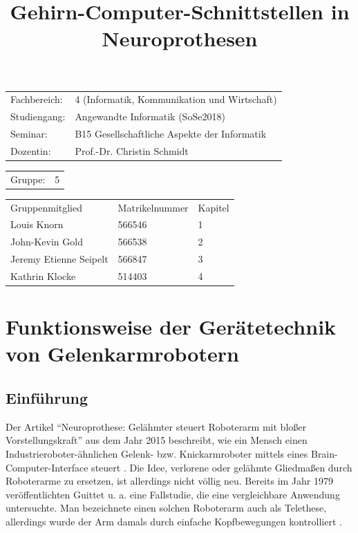 \documentclass[11pt,ngerman,parskip=half]{scrartcl}
\author{}
\title{Gehirn-Computer-Schnittstellen in Neuroprothesen}
\begin{document}
\maketitle
\begin{tabular}{ll}
  Fachbereich: & 4 (Informatik, Kommunikation und Wirtschaft) \\
  Studiengang: & Angewandte Informatik (SoSe2018)             \\
  Seminar:     & B15 Gesellschaftliche Aspekte der Informatik \\
  Dozentin:    & Prof.-Dr. Christin Schmidt                   \\
\end{tabular}

\begin{tabular}{ll}
  Gruppe: & 5 \\
\end{tabular}

\begin{tabular}{lll}
  Gruppenmitglied        & Matrikelnummer & Kapitel\\
  Louis Knorn            & 566546         & 1\\
  John-Kevin Gold        & 566538         & 2\\
  Jeremy Etienne Seipelt & 566847         & 3\\
  Kathrin Klocke         & 514403         & 4\\
\end{tabular}

\newpage
\tableofcontents
\newpage
\listoffigures
\newpage
\listoftables
\newpage

\section{Funktionsweise der Gerätetechnik von Gelenkarmrobotern}
\label{sec:john}
\subsection{Einführung}
\label{subsec:john_einfuehrung}
Der Artikel \enquote{Neuroprothese: Gelähmter steuert Roboterarm mit bloßer
Vorstellungskraft} aus dem Jahr 2015 beschreibt, wie ein Mensch einen
Industrieroboter-ähnlichen Gelenk- bzw. Knickarmroboter mittels eines
Brain-Computer-Interface steuert
\parencite[vgl.][]{merkelt_neuroprothesen:_2015}. Die Idee, verlorene oder
gelähmte Gliedmaßen durch Roboterarme zu ersetzen, ist allerdings nicht völlig
neu. Bereits im Jahr 1979 veröffentlichten Guittet u. a. eine Fallstudie, die
eine vergleichbare Anwendung untersuchte. Man bezeichnete einen solchen
Roboterarm auch als Telethese, allerdings wurde der Arm damals durch einfache
Kopfbewegungen kontrolliert \parencite[vgl.][]{guittet_spartacus_1979}.
\end{document}
